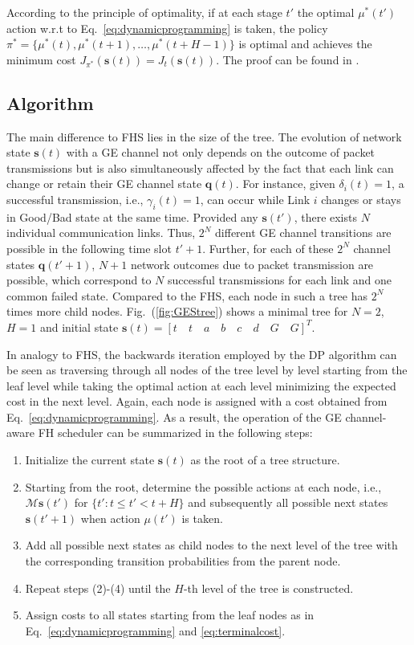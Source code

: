 According to the principle of optimality, if at each stage $t'$ the optimal
$\mu^*(t')$ action w.r.t to Eq.~\eqref{eq:dynamicprogramming} is taken, the
policy $\pi^* = \{\mu^*(t), \mu^*(t+1), \dots, \mu^*(t + H-1)\}$ is optimal and
achieves the minimum cost $J_{\pi^*}(\boldsymbol{s}(t)) = J_t(\boldsymbol{s}(t))
$. The proof can be found in \cite{bertsekas1995dynamic}.

\subsection{Algorithm}
The main difference to FHS lies in the size of the tree. The evolution of
network state $\boldsymbol{s}(t)$ with a GE channel not only depends on the
outcome of packet transmissions but is also simultaneously affected by the fact
that each link can change or retain their GE channel state $\boldsymbol{q}(t) $.
For instance, given $\delta_i(t)=1$, a successful transmission, i.e.,
$\gamma_i(t)=1$, can occur while Link $i$ changes or stays in Good/Bad state at
the same time. Provided any $\boldsymbol{s}(t')$, there exists $N$ individual
communication links. Thus, $2^N$ different GE channel transitions are possible
in the following time slot $t'+1$. Further, for each of these $2^N$ channel
states $\boldsymbol{q}(t'+1)$, $N+1$ network outcomes due to packet transmission
are possible, which correspond to $N$ successful transmissions for each link and
one common failed state. Compared to the FHS, each node in such a tree has $2^N$
times more child nodes. Fig.~(\ref{fig:GEStree}) shows a minimal tree for $N=2$,
$H=1$ and initial state $\boldsymbol{s}(t)=\left[t\quad t\quad a\quad b\quad
c\quad d\quad G\quad G \right]^T$.

In analogy to FHS, the backwards iteration employed by the DP algorithm can be
seen as traversing through all nodes of the tree level by level starting from
the leaf level while taking the optimal action at each level minimizing the
expected cost in the next level. Again, each node is assigned with a cost
obtained from Eq.~\eqref{eq:dynamicprogramming}. As a result, the operation of
the GE channel-aware FH scheduler can be summarized in the following steps:

\begin{enumerate}
	\item Initialize the current state $\boldsymbol{s}(t)$ as the root of a tree
	structure.
	\item Starting from the root, determine the possible actions at each node,
	i.e., $\mathcal{M}\boldsymbol{s}(t')$ for $\{t': t \leq t' < t + H \}$ and
	subsequently all possible next states $\boldsymbol{s}(t' + 1)$ when action
	$\mu(t')$ is taken.
	\item Add all possible next states as child nodes to the next level of the
	tree with the corresponding transition probabilities from the parent node.
	\item Repeat steps (2)-(4) until the $H$-th level of the tree is constructed.
	\item Assign costs to all states starting from the leaf nodes as in
	Eq.~\eqref{eq:dynamicprogramming} and \eqref{eq:terminalcost}.
\end{enumerate}


